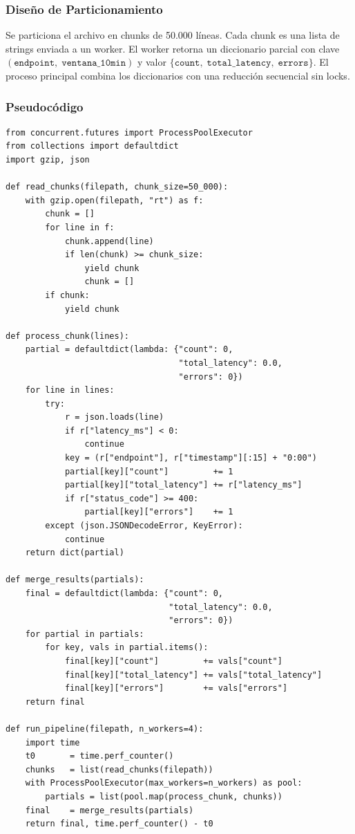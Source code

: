 \documentclass[10pt,a4paper]{article}
\begin{document}
\subsubsection{Dise\~no de Particionamiento}

Se particiona el archivo en chunks de 50.000 l\'ineas. Cada chunk es una lista
de strings enviada a un worker. El worker retorna un diccionario parcial con
clave $(\texttt{endpoint},\; \texttt{ventana\_10min})$ y valor
$\{\texttt{count},\; \texttt{total\_latency},\; \texttt{errors}\}$.
El proceso principal combina los diccionarios con una reducci\'on secuencial
sin locks.

\subsubsection{Pseudoc\'odigo}

\begin{lstlisting}[style=python, caption={Pipeline con ProcessPoolExecutor.}]
from concurrent.futures import ProcessPoolExecutor
from collections import defaultdict
import gzip, json

def read_chunks(filepath, chunk_size=50_000):
    with gzip.open(filepath, "rt") as f:
        chunk = []
        for line in f:
            chunk.append(line)
            if len(chunk) >= chunk_size:
                yield chunk
                chunk = []
        if chunk:
            yield chunk

def process_chunk(lines):
    partial = defaultdict(lambda: {"count": 0,
                                   "total_latency": 0.0,
                                   "errors": 0})
    for line in lines:
        try:
            r = json.loads(line)
            if r["latency_ms"] < 0:
                continue
            key = (r["endpoint"], r["timestamp"][:15] + "0:00")
            partial[key]["count"]         += 1
            partial[key]["total_latency"] += r["latency_ms"]
            if r["status_code"] >= 400:
                partial[key]["errors"]    += 1
        except (json.JSONDecodeError, KeyError):
            continue
    return dict(partial)

def merge_results(partials):
    final = defaultdict(lambda: {"count": 0,
                                 "total_latency": 0.0,
                                 "errors": 0})
    for partial in partials:
        for key, vals in partial.items():
            final[key]["count"]         += vals["count"]
            final[key]["total_latency"] += vals["total_latency"]
            final[key]["errors"]        += vals["errors"]
    return final

def run_pipeline(filepath, n_workers=4):
    import time
    t0       = time.perf_counter()
    chunks   = list(read_chunks(filepath))
    with ProcessPoolExecutor(max_workers=n_workers) as pool:
        partials = list(pool.map(process_chunk, chunks))
    final    = merge_results(partials)
    return final, time.perf_counter() - t0
\end{lstlisting}
\end{document}
